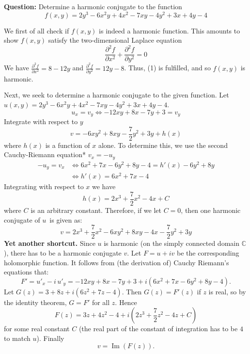 \begin{example}
\end{example}

\begin{example}
\textbf{Question:} Determine a harmonic conjugate to the function \begin{equation*} f(x,y)=2y^{3}-6x^{2}y+4x^{2}-7xy-4y^{2}+3x+4y-4 \end{equation*}

We first of all check if $f(x,y)$ is indeed a harmonic function. This amounts to show $f(x,y)$ satisfy the two-dimensional Laplace equation
\begin{equation*}
\frac{\partial^{2 }f}{\partial x^{2}}+\frac{\partial^{2} f}{\partial y^{2}}=0 \tag{1}
\end{equation*}
We have $\frac{\partial^{2}f}{\partial x^{2}}=8-12y$ and $\frac{\partial^{2} f}{\partial y^{2}}=12y-8$. Thus, (1) is fulfilled, and so $f(x,y)$ is harmonic. 

Next, we seek to determine a harmonic conjugate to the given function. Let $u(x,y)=2y^{3}-6x^{2}y+4x^{2}-7xy-4y^{2}+3x+4y-4$. 
\begin{equation*}
u_{x}=v_{y} \iff -12xy+8x-7y+3=v_{y}
\end{equation*}
Integrate with respect to $y$
\begin{equation*}
v=-6xy^{2}+8xy-\frac{7}{2}y^{2}+3y+h(x) \tag{2}
\end{equation*}
where $h(x)$ is a function of $x$ alone. To determine this, we use the second Cauchy-Riemann equation* $v_{x}=-u_{y}$ 
\begin{align*}
-u_{y}=v_{x} &\iff 6x^{2}+7x-6y^{2}+8y-4=h'(x)-6y^{2}+8y \\
&\iff h'(x)=6x^{2}+7x-4
\end{align*}
Integrating with respect to $x$ we have
\begin{equation*}
h(x)=2x^{3}+\frac{7}{2}x^{2}-4x+C
\end{equation*}
where $C$ is an arbitrary constant. Therefore, if we let $C=0$, then one harmonic conjugate of $u$ is given as:
\begin{equation*}
v=2x^{3}+\frac{7}{2}x^{2}-6xy^{2}+8xy-4x-\frac{7}{2}y^{2}+3y
\end{equation*}
\textbf{Yet another shortcut.} Since $u$ is harmonic (on the simply connected domain $\mathbb{C}$), there has to be a harmonic conjugate $v$. Let $F = u+iv$ be the corresponding holomorphic function. It follows from (the derivation of) Cauchy Riemann's equations that:
$$
F' = u'_x - i\,u'_y = -12xy + 8x -7y + 3 + i(6x^2+7x-6y^2+8y-4).
$$
Let $G(z) = 3 +  8z + i(6z^2+7z-4)$. Then $G(z) = F'(z)$ if $z$ is real, so by the identity theorem, $G = F'$ for all $z$. Hence
$$
F(z) = 3z + 4z^2 - 4 + i(2z^3+\frac72z^2-4z+C)
$$
for some real constant $C$ (the real part of the constant of integration has to be $4$ to match $u$). Finally
$$
v = \operatorname{Im}(F(z)).
$$
\end{example}

